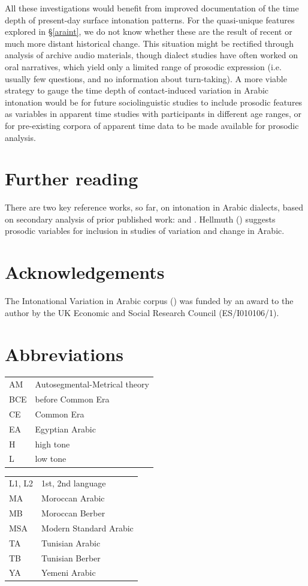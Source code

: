 \documentclass[output=paper]{langsci/langscibook}
\begin{document}
All these investigations would benefit from improved documentation of the time depth of present-day surface intonation patterns. For the quasi-unique features explored in §\ref{araint}, we do not know whether these are the result of recent or much more distant historical change. This situation might be rectified through analysis of archive audio materials, though dialect studies have often worked on oral narratives, which yield only a limited range of prosodic expression (i.e. usually few questions, and no information about turn-taking). A more viable strategy to gauge the time depth of contact-induced variation in Arabic intonation would be for future sociolinguistic studies to include prosodic features as variables in apparent time studies with participants in different age ranges, or for pre-existing corpora of apparent time data to be made available for prosodic analysis.

\section*{Further reading}

There are two key reference works, so far, on intonation in Arabic dialects, based on secondary analysis of prior published work: \citet{Chahal2011} and \citet{ElZarka2017}. Hellmuth (\citeyear{Hellmuth2019}) suggests prosodic variables for inclusion in studies of variation and change in Arabic. 

\section*{Acknowledgements}

The Intonational Variation in Arabic corpus (\citeyear{HellmuthAlmbark2017}) was funded by an award to the author by the UK Economic and Social Research Council (ES/I010106/1).

\section*{Abbreviations}

\begin{tabularx}{.45\textwidth}{lQ}
AM & Autosegmental-Metrical theory \\
BCE & before Common Era \\
CE & Common Era \\
EA & Egyptian Arabic \\
H & high tone \\
L & low tone \\
\end{tabularx}
\begin{tabularx}{.45\textwidth}{lQ}
L1, L2 & 1st, 2nd language \\
MA & Moroccan Arabic \\
MB & Moroccan Berber \\
MSA & Modern Standard Arabic \\
TA & Tunisian Arabic \\
TB & Tunisian Berber \\
YA & Yemeni Arabic \\
\end{tabularx}


\sloppy
\printbibliography[heading=subbibliography,notkeyword=this]
\end{document}
